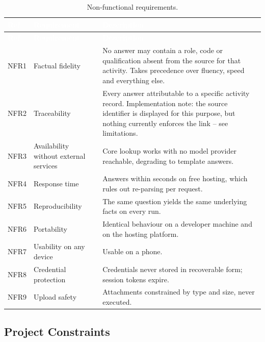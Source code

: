 \begin{longtable}{|p{}|p{}|p{}|}
\caption{Non-functional requirements.}\label{tab:nfr}\\
\hline
\rowcolor{myblue}\textcolor{white}{\textbf{Ref.}} & \textcolor{white}{\textbf{Requirement}} & \textcolor{white}{\textbf{Description}} \\
\hline
\endfirsthead
\hline
\rowcolor{myblue}\textcolor{white}{\textbf{Ref.}} & \textcolor{white}{\textbf{Requirement}} & \textcolor{white}{\textbf{Description}} \\
\hline
\endhead
NFR1 & Factual fidelity & No answer may contain a role, code or qualification absent from the source for that activity. Takes precedence over fluency, speed and everything else. \\ \hline
NFR2 & Traceability & Every answer attributable to a specific activity record. Implementation note: the source identifier is displayed for this purpose, but nothing currently enforces the link -- see limitations. \\ \hline
NFR3 & Availability without external services & Core lookup works with no model provider reachable, degrading to template answers. \\ \hline
NFR4 & Response time & Answers within seconds on free hosting, which rules out re-parsing per request. \\ \hline
NFR5 & Reproducibility & The same question yields the same underlying facts on every run. \\ \hline
NFR6 & Portability & Identical behaviour on a developer machine and on the hosting platform. \\ \hline
NFR7 & Usability on any device & Usable on a phone. \\ \hline
NFR8 & Credential protection & Credentials never stored in recoverable form; session tokens expire. \\ \hline
NFR9 & Upload safety & Attachments constrained by type and size, never executed. \\ \hline
\end{longtable}

\subsection{Project Constraints}

